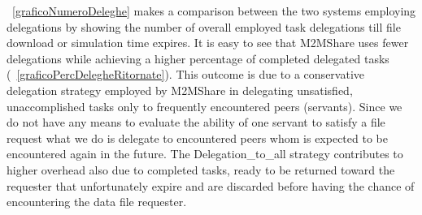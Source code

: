 
\figurename~\ref{graficoNumeroDeleghe} makes a comparison between the two systems employing delegations by showing the number of overall employed task delegations till file download or simulation time expires. It is easy to see that M2MShare uses fewer delegations while achieving a higher percentage of completed delegated tasks (\figurename~\ref{graficoPercDelegheRitornate}). This outcome is due to a conservative delegation strategy employed by M2MShare in delegating unsatisfied, unaccomplished tasks only to frequently encountered peers
(servants). Since we do not have any means to evaluate the ability of one servant to satisfy a file request what we do is delegate to encountered peers whom is expected to be encountered again in the future. The Delegation\_to\_all strategy contributes to higher overhead also due to completed tasks, ready to be returned toward the requester that unfortunately expire and are discarded before having the chance of encountering the data file requester. \\

